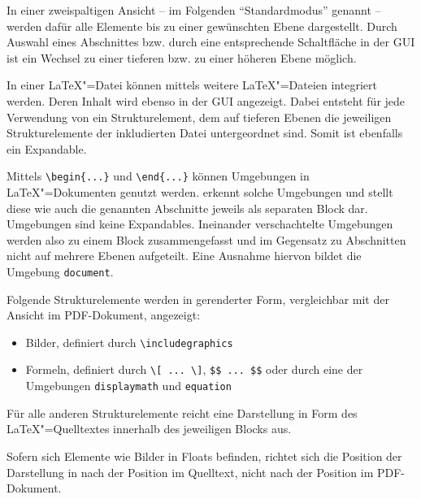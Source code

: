In einer zweispaltigen Ansicht -- im Folgenden \enquote{Standardmodus} genannt -- werden dafür alle Elemente bis zu
einer gewünschten Ebene dargestellt.
Durch Auswahl eines Abschnittes bzw. durch eine entsprechende Schaltfläche in der GUI ist ein Wechsel zu einer tieferen
bzw. zu einer höheren Ebene möglich.


In einer \LaTeX"=Datei können mittels \verb|| weitere \LaTeX"=Dateien integriert werden.
Deren Inhalt wird ebenso in der GUI angezeigt.
Dabei entsteht für jede Verwendung von \verb|| ein Strukturelement, dem auf tieferen Ebenen die jeweiligen
Strukturelemente der inkludierten Datei untergeordnet sind.
Somit ist \verb|| ebenfalls ein Expandable.

\clearpage


Mittels \verb|\begin{...}| und \verb|\end{...}| können Umgebungen in \LaTeX"=Dokumenten genutzt werden.
\texla{} erkennt solche Umgebungen und stellt diese wie auch die genannten Abschnitte jeweils als separaten Block dar.
Umgebungen sind keine Expandables.
Ineinander verschachtelte Umgebungen werden also zu einem Block zusammengefasst und im Gegensatz zu Abschnitten nicht
auf mehrere Ebenen aufgeteilt.
Eine Ausnahme hiervon bildet die Umgebung \verb|document|.


Folgende Strukturelemente werden in gerenderter Form, vergleichbar mit der Ansicht im PDF-Dokument, angezeigt:

\begin{itemize}
  \item Bilder, definiert durch \verb|\includegraphics|
  \item Formeln, definiert durch \verb|\[ ... \]|, \verb|$$ ... $$| oder durch eine der Umgebungen \verb|displaymath|
  und \verb|equation|
\end{itemize}

Für alle anderen Strukturelemente reicht eine Darstellung in Form des \LaTeX"=Quelltextes innerhalb des jeweiligen
Blocks aus.

Sofern sich Elemente wie Bilder in Floats befinden, richtet sich die Position der Darstellung in \texla{} nach der
Position im Quelltext, nicht nach der Position im PDF-Dokument.

